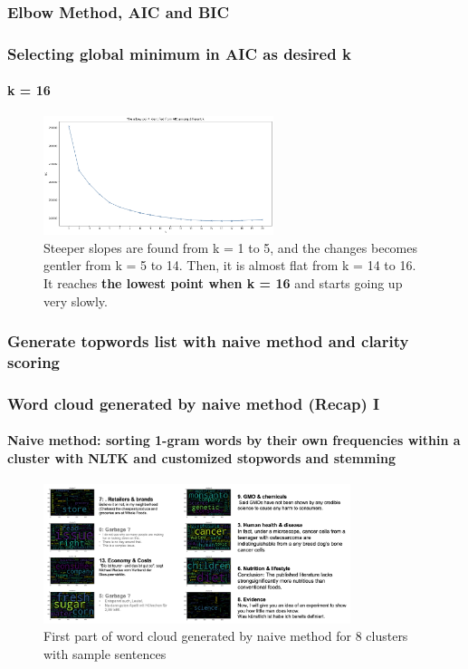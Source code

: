 \documentclass{tum-presentation}
\begin{document}
\subsubsection{Elbow Method, AIC and BIC}
\begin{frame}
  \frametitle{Selecting global minimum in AIC as desired k}
  \framesubtitle{k = 16}
  \begin{center}
    \begin{figure}[t]
      \includegraphics[width=0.6\textwidth]{images/kmean-AIC.png}
      \caption{Steeper slopes are found from k = 1 to 5, and the changes becomes gentler from k = 5 to 14. Then, it is almost flat from k = 14 to 16. It reaches \textbf{the lowest point when k = 16} and starts going up very slowly.}
    \end{figure}
  \end{center}
\end{frame}


\subsubsection{Generate topwords list with naive method and clarity scoring} %
\begin{frame}
  \frametitle{Word cloud generated by naive method (Recap) I}
  \framesubtitle{Naive method: sorting 1-gram words by their own frequencies within a cluster with NLTK and customized stopwords and stemming}
  \begin{center}
    \begin{figure}[t]
      \includegraphics[width=0.8\textwidth]{figures/example16_1.png}
      \caption{First part of word cloud generated by naive method for 8 clusters with sample sentences}
    \end{figure}
  \end{center}
\end{frame}
\end{document}
